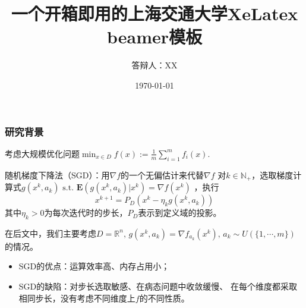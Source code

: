 \documentclass[9pt,aspectratio=169]{beamer}
\title{一个开箱即用的上海交通大学XeLatex beamer模板}
\subtitle{}
\date{\today}
\author{答辩人：XX}
\begin{document}
\begin{frame}
	\titlepage
\end{frame}
\begin{frame}
\frametitle{研究背景}
考虑大规模优化问题$\min_{x\in D} f(x):=\frac{1}{m}\sum_{i=1}^{m}f_i(x).$%
\begin{block}{随机梯度下降法（SGD）：用$\nabla f$的一个无偏估计来代替$\nabla f$}
	对$k\in \mathbb{N}_+$，选取梯度计算式$g(x^k,a_k) \,\,\mathrm{s.t.}\,\,\mathbf{E}(g(x^k,a_k)|x^k)=\nabla f(x^k)$
，执行
	\begin{equation}
		x^{k+1}=P_D(x^k-\eta_k g(x^k,a_k))
	\end{equation}
	其中$\eta_k>0$为每次迭代时的步长，$P_D$表示到定义域的投影。
\end{block}
\vspace{0.2cm}
在后文中，我们主要考虑$D=\mathbb{R}^{n},\,g(x^k,a_k)=\nabla f_{a_{k}}\left(x^{k}\right),\,a_k \sim U (\{1,\cdots,m\})$
的情况。
\vspace{0.3cm}
\begin{itemize}
	\item SGD的优点：运算效率高、内存占用小；
	\item SGD的缺陷：对步长选取敏感、在病态问题中收敛缓慢、%
	在每个维度都采取相同步长，没有考虑不同维度上$f$的不同性质。	
\end{itemize}

\end{frame}
\end{document}
